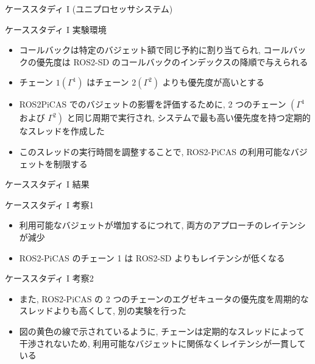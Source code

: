 \begin{frame}{ケーススタディ I (ユニプロセッサシステム)}
\end{frame}

\begin{frame}{ケーススタディ I 実験環境}
    \begin{itemize}
        \item コールバックは特定のバジェット額で同じ予約に割り当てられ, コールバックの優先度は ROS2-SD のコールバックのインデックスの降順で与えられる
        \item チェーン $1\left(\Gamma^{1}\right)$ はチェーン $2\left(\Gamma^{2}\right)$ よりも優先度が高いとする
        \item ROS2PiCAS でのバジェットの影響を評価するために, 2 つのチェーン $\left(\Gamma^{1}\right.$ および $\left.\Gamma^{2}\right)$ と同じ周期で実行され, システムで最も高い優先度を持つ定期的なスレッドを作成した
        \item このスレッドの実行時間を調整することで, ROS2-PiCAS の利用可能なバジェットを制限する
    \end{itemize}
\end{frame}

\begin{frame}{ケーススタディ I 結果}
\end{frame}

\begin{frame}{ケーススタディ I 考察1}
    \begin{itemize}
        \item 利用可能なバジェットが増加するにつれて, 両方のアプローチのレイテンシが減少
        \item ROS2-PiCAS のチェーン 1 は ROS2-SD よりもレイテンシが低くなる
    \end{itemize}
\end{frame}

\begin{frame}{ケーススタディ I 考察2}
    \begin{itemize}
        \item また, ROS2-PiCAS の 2 つのチェーンのエグゼキュータの優先度を周期的なスレッドよりも高くして, 別の実験を行った
        \item 図の黄色の線で示されているように, チェーンは定期的なスレッドによって干渉されないため, 利用可能なバジェットに関係なくレイテンシが一貫している
    \end{itemize}
\end{frame}

